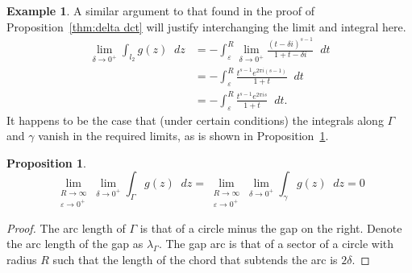 \documentclass[a4paper]{article}
\newcommand*\diff{\mathop{}\!d} %
\newtheorem{proposition}[theorem]{Proposition}
\theoremstyle{definition}
\newtheorem{example}[theorem]{Example}
\begin{document}
\begin{example}
    A similar argument to that found in the proof of Proposition~\ref{thm:delta dct} will justify interchanging the limit and integral here.
    \begin{align*}
        \lim_{\delta \to 0^+} \int_{l_2} g(z) \diff z & = - \int_\varepsilon^R \lim_{\delta \to 0^+} \frac{(t-\delta i)^{s-1}}{1+t-\delta i} \diff t \\
                                                      & = - \int_\varepsilon^R \frac{t^{s-1} e^{2 \pi i (s-1)}}{1+t} \diff t                         \\
                                                      & = - \int_\varepsilon^R \frac{t^{s-1} e^{2 \pi i s}}{1+t} \diff t.
    \end{align*}
    It happens to be the case that (under certain conditions) the integrals along $\Gamma$ and $\gamma$ vanish in the required limits, as is shown in Proposition~\ref{thm:gamma vanish}.
    \begin{proposition} \label{thm:gamma vanish}
        \begin{equation*}
            \lim_{\substack{R \to \infty \\ \varepsilon \to 0^+}} \lim_{\delta \to 0^+} \int_\Gamma g(z) \diff z = \lim_{\substack{R \to \infty \\ \varepsilon \to 0^+}} \lim_{\delta \to 0^+} \int_\gamma g(z) \diff z = 0
        \end{equation*}
    \end{proposition}
    \begin{proof}
        The arc length of $\Gamma$ is that of a circle minus the gap on the right.
        Denote the arc length of the gap as $\lambda_\Gamma$.
        The gap arc is that of a sector of a circle with radius $R$ such that the length of the chord that subtends the arc is $2\delta$.


\end{proof}
\end{example}
\end{document}
